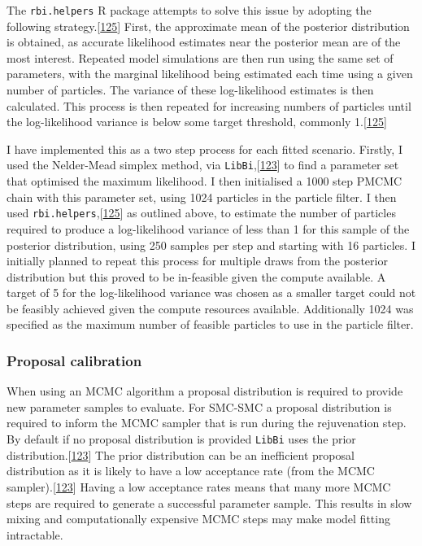 \documentclass[11pt,twoside]{bristolthesis}
\begin{document}
  The \texttt{rbi.helpers} R package attempts to solve this issue by adopting the following strategy.{[}\protect\hyperlink{ref-Funk:2019uw}{125}{]} First, the approximate mean of the posterior distribution is obtained, as accurate likelihood estimates near the posterior mean are of the most interest. Repeated model simulations are then run using the same set of parameters, with the marginal likelihood being estimated each time using a given number of particles. The variance of these log-likelihood estimates is then calculated. This process is then repeated for increasing numbers of particles until the log-likelihood variance is below some target threshold, commonly 1.{[}\protect\hyperlink{ref-Funk:2019uw}{125}{]}
  
  I have implemented this as a two step process for each fitted scenario. Firstly, I used the Nelder-Mead simplex method, via \texttt{LibBi},{[}\protect\hyperlink{ref-Murray2015}{123}{]} to find a parameter set that optimised the maximum likelihood. I then initialised a 1000 step PMCMC chain with this parameter set, using 1024 particles in the particle filter. I then used \texttt{rbi.helpers},{[}\protect\hyperlink{ref-Funk:2019uw}{125}{]} as outlined above, to estimate the number of particles required to produce a log-likelihood variance of less than 1 for this sample of the posterior distribution, using 250 samples per step and starting with 16 particles. I initially planned to repeat this process for multiple draws from the posterior distribution but this proved to be in-feasible given the compute available. A target of 5 for the log-likelihood variance was chosen as a smaller target could not be feasibly achieved given the compute resources available. Additionally 1024 was specified as the maximum number of feasible particles to use in the particle filter.
  
  \hypertarget{proposal-calibration}{%
  \subsubsection{Proposal calibration}\label{proposal-calibration}}
  
  When using an MCMC algorithm a proposal distribution is required to provide new parameter samples to evaluate. For SMC-SMC a proposal distribution is required to inform the MCMC sampler that is run during the rejuvenation step. By default if no proposal distribution is provided \texttt{LibBi} uses the prior distribution.{[}\protect\hyperlink{ref-Murray2015}{123}{]} The prior distribution can be an inefficient proposal distribution as it is likely to have a low acceptance rate (from the MCMC sampler).{[}\protect\hyperlink{ref-Murray2015}{123}{]} Having a low acceptance rates means that many more MCMC steps are required to generate a successful parameter sample. This results in slow mixing and computationally expensive MCMC steps may make model fitting intractable.
  
\end{document}
